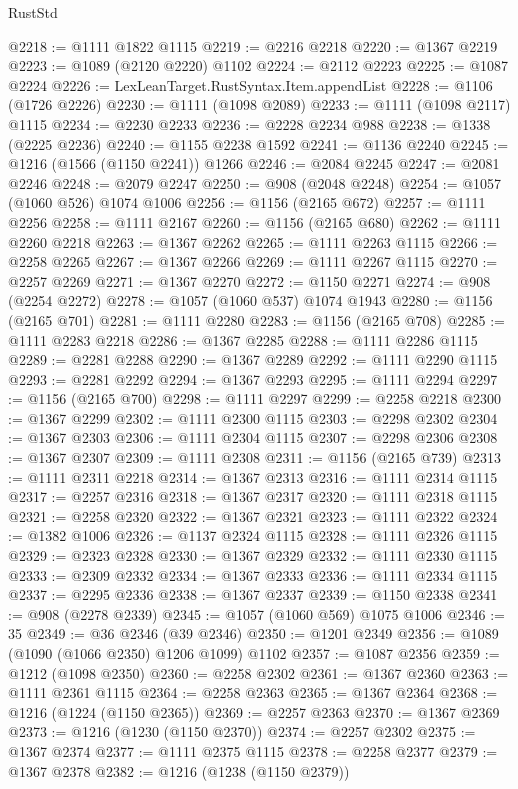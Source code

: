 \begin{lexlean}{RustStd}
\begin{coremodule}
{\begin{coremodule}
{{{{{{{{{{{{{{{{{{{{{{{{{{@2218 := @1111 @1822 @1115
@2219 := @2216 @2218
@2220 := @1367 @2219
@2223 := @1089 (@2120 @2220) @1102
@2224 := @2112 @2223
@2225 := @1087 @2224
@2226 := LexLeanTarget.RustSyntax.Item.appendList
@2228 := @1106 (@1726 @2226)
@2230 := @1111 (@1098 @2089)
@2233 := @1111 (@1098 @2117) @1115
@2234 := @2230 @2233
@2236 := @2228 @2234 @988
@2238 := @1338 (@2225 @2236)
@2240 := @1155 @2238 @1592
@2241 := @1136 @2240
@2245 := @1216 (@1566 (@1150 @2241)) @1266
@2246 := @2084 @2245
@2247 := @2081 @2246
@2248 := @2079 @2247
@2250 := @908 (@2048 @2248)
@2254 := @1057 (@1060 @526) @1074 @1006
@2256 := @1156 (@2165 @672)
@2257 := @1111 @2256
@2258 := @1111 @2167
@2260 := @1156 (@2165 @680)
@2262 := @1111 @2260 @2218
@2263 := @1367 @2262
@2265 := @1111 @2263 @1115
@2266 := @2258 @2265
@2267 := @1367 @2266
@2269 := @1111 @2267 @1115
@2270 := @2257 @2269
@2271 := @1367 @2270
@2272 := @1150 @2271
@2274 := @908 (@2254 @2272)
@2278 := @1057 (@1060 @537) @1074 @1943
@2280 := @1156 (@2165 @701)
@2281 := @1111 @2280
@2283 := @1156 (@2165 @708)
@2285 := @1111 @2283 @2218
@2286 := @1367 @2285
@2288 := @1111 @2286 @1115
@2289 := @2281 @2288
@2290 := @1367 @2289
@2292 := @1111 @2290 @1115
@2293 := @2281 @2292
@2294 := @1367 @2293
@2295 := @1111 @2294
@2297 := @1156 (@2165 @700)
@2298 := @1111 @2297
@2299 := @2258 @2218
@2300 := @1367 @2299
@2302 := @1111 @2300 @1115
@2303 := @2298 @2302
@2304 := @1367 @2303
@2306 := @1111 @2304 @1115
@2307 := @2298 @2306
@2308 := @1367 @2307
@2309 := @1111 @2308
@2311 := @1156 (@2165 @739)
@2313 := @1111 @2311 @2218
@2314 := @1367 @2313
@2316 := @1111 @2314 @1115
@2317 := @2257 @2316
@2318 := @1367 @2317
@2320 := @1111 @2318 @1115
@2321 := @2258 @2320
@2322 := @1367 @2321
@2323 := @1111 @2322
@2324 := @1382 @1006
@2326 := @1137 @2324 @1115
@2328 := @1111 @2326 @1115
@2329 := @2323 @2328
@2330 := @1367 @2329
@2332 := @1111 @2330 @1115
@2333 := @2309 @2332
@2334 := @1367 @2333
@2336 := @1111 @2334 @1115
@2337 := @2295 @2336
@2338 := @1367 @2337
@2339 := @1150 @2338
@2341 := @908 (@2278 @2339)
@2345 := @1057 (@1060 @569) @1075 @1006
@2346 := 35
@2349 := @36 @2346 (@39 @2346)
@2350 := @1201 @2349
@2356 := @1089 (@1090 (@1066 @2350) @1206 @1099) @1102
@2357 := @1087 @2356
@2359 := @1212 (@1098 @2350)
@2360 := @2258 @2302
@2361 := @1367 @2360
@2363 := @1111 @2361 @1115
@2364 := @2258 @2363
@2365 := @1367 @2364
@2368 := @1216 (@1224 (@1150 @2365))
@2369 := @2257 @2363
@2370 := @1367 @2369
@2373 := @1216 (@1230 (@1150 @2370))
@2374 := @2257 @2302
@2375 := @1367 @2374
@2377 := @1111 @2375 @1115
@2378 := @2258 @2377
@2379 := @1367 @2378
@2382 := @1216 (@1238 (@1150 @2379))
}}}}}}}}}}}}}}}}}}}}}}}}}}
\end{coremodule}}
\end{coremodule}
\end{lexlean}

